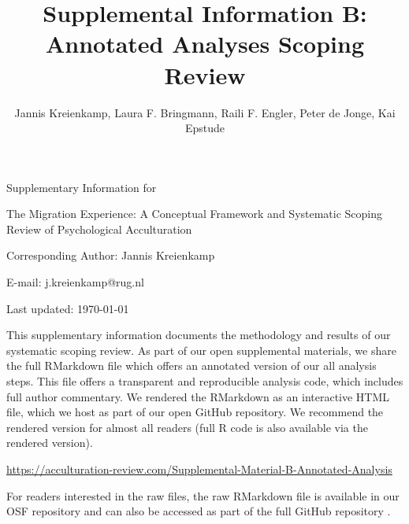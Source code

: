 \documentclass[man, 12pt, a4paper]{apa7}
\title{Supplemental Information B: Annotated Analyses Scoping Review}
\author{Jannis Kreienkamp, Laura F. Bringmann, Raili F. Engler, Peter de Jonge, Kai Epstude}
\begin{document}
\begin{titlepage}
	{\noindent\Large Supplementary Information for \par}
	\vspace{0.5cm}
	{\noindent\Large The Migration Experience: A Conceptual Framework and Systematic Scoping Review of Psychological Acculturation\par}
	\vspace{1.5cm}
	{\noindent\LARGE\bfseries \thetitle \par}
	\vspace{2cm}
	{\noindent\Large\itshape \theauthor \par}
	\vfill
	\noindent Corresponding Author: Jannis Kreienkamp\par
	\noindent E-mail: j.kreienkamp@rug.nl\par
	\vfill

	{\noindent Last updated: \today\par}
\end{titlepage}

\begin{center}
   \textbf{\thetitle} 
\end{center}

This supplementary information documents the methodology and results of our systematic scoping review. As part of our open supplemental materials, we share the full RMarkdown file which offers an annotated version of our all analysis steps. This file offers a transparent and reproducible analysis code, which includes full author commentary. We rendered the RMarkdown as an interactive HTML file, which we host as part of our open GitHub repository. We recommend the rendered version for almost all readers (full R code is also available via the rendered version).

\vspace{.5cm}
\begin{tcolorbox}
    \vspace{0.2cm} \centering 
    \href{https://janniscodes.github.io/acculturation-review/Supplemental-Material-B-Annotated-Analysis}{https://acculturation-review.com/Supplemental-Material-B-Annotated-Analysis}
    \vspace{0.2cm} 
\end{tcolorbox}

For readers interested in the raw files, the raw RMarkdown file is available in our OSF repository \citep[see][]{Kreienkamp2021a} and can also be accessed as part of the full GitHub repository \citep[][]{Kreienkamp2021b}.

\printbibliography
\end{document}
